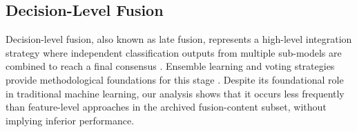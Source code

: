 \documentclass[]{interact}
\theoremstyle{plain}%
\theoremstyle{definition}
\theoremstyle{remark}
\DeclareRobustCommand{\DIFadd}[1]{{\protect\color{DIFaddcolor}\uwave{#1}}}
\DeclareRobustCommand{\DIFdel}[1]{{\protect\color{DIFdelcolor}\sout{#1}}}
\def\DIFadd#1{#1}%
\def\DIFdel#1{}%
\begin{document}
\subsection{\DIFdel{Decision-level}\hspace{0.33em}\DIFadd{Decision-Level} Fusion}
Decision-level fusion, also known as late fusion, represents a high-level integration strategy where independent classification \DIFdel{or} \DIFdel{simulation} outputs from multiple sub-models are combined to reach a final consensus {\hypersetup{citecolor=red}\color{red}\citep{ORIGPu2023DecisionFusion}} {\color{blue}\citep{55}}. \DIFdel{Bibliometric} \DIFdel{data} \DIFdel{identifies} \DIFdel{keywords} \DIFdel{such} \DIFdel{as} \DIFdel{ensemble} \DIFadd{Ensemble} learning\DIFdel{,} \DIFdel{`}\DIFdel{`}\DIFdel{Random} \DIFdel{Forest''}\DIFdel{,} and \DIFdel{`}\DIFdel{`} voting \DIFdel{strategies''} \DIFdel{as} \DIFdel{the} \DIFdel{primary} \DIFadd{strategies} \DIFadd{provide} methodological \DIFdel{pillars} \DIFdel{of} \DIFadd{foundations} \DIFadd{for} this stage \citep{55}. Despite its foundational role in traditional machine learning, our analysis shows that \DIFdel{its} \DIFdel{research} \DIFdel{heat} \DIFadd{it} \DIFadd{occurs} \DIFadd{less} \DIFadd{frequently} \DIFadd{than} \DIFadd{feature-level} \DIFadd{approaches} in the \DIFdel{LULC} \DIFdel{domain} \DIFdel{has} \DIFdel{remained} \DIFdel{relatively} \DIFdel{low} \DIFdel{compared} \DIFdel{to} \DIFdel{feature-level} \DIFdel{approaches} \DIFadd{archived} \DIFadd{fusion-content} \DIFadd{subset}\DIFadd{,} \DIFadd{without} \DIFadd{implying} \DIFadd{inferior} \DIFadd{performance}.
\end{document}
